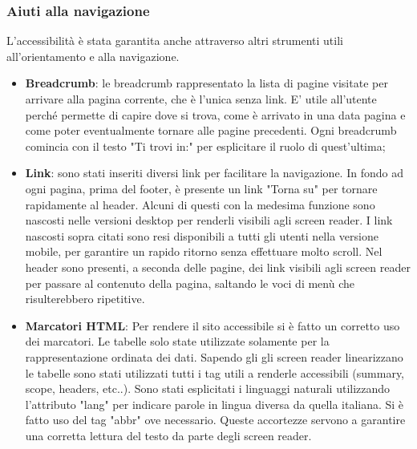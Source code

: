 \subsubsection{Aiuti alla navigazione}
 L'accessibilità è stata garantita anche attraverso altri strumenti utili all'orientamento e alla navigazione.
 \begin{itemize}
     \item \textbf{Breadcrumb}: le breadcrumb rappresentato la lista di pagine visitate per arrivare alla pagina corrente, che è l'unica senza link. E' utile all'utente perché permette di capire dove si trova, come è arrivato in una data pagina e come poter eventualmente tornare alle pagine precedenti. Ogni breadcrumb comincia con il testo "Ti trovi in:" per esplicitare il ruolo di quest'ultima;
     \item \textbf{Link}: sono stati inseriti diversi link per facilitare la navigazione. In fondo ad ogni pagina, prima del footer, è presente un link "Torna su" per tornare rapidamente al header. Alcuni di questi con la medesima funzione sono nascosti nelle versioni desktop per renderli visibili agli screen reader. 
     I link nascosti sopra citati sono resi disponibili a tutti gli utenti nella versione mobile, per garantire un rapido ritorno senza effettuare molto scroll.
     Nel header sono presenti, a seconda delle pagine, dei link visibili agli screen reader per passare al contenuto della pagina, saltando le voci di menù che risulterebbero ripetitive.
     \item \textbf{Marcatori HTML}: Per rendere il sito accessibile si è fatto un corretto uso dei marcatori.
     Le tabelle solo state utilizzate solamente per la rappresentazione ordinata dei dati. Sapendo gli gli screen reader linearizzano le tabelle sono stati utilizzati tutti i tag utili a renderle accessibili (summary, scope, headers, etc..). Sono stati esplicitati i linguaggi naturali utilizzando l'attributo "lang" per indicare parole in lingua diversa da quella italiana. Si è fatto uso del tag "abbr" ove necessario. Queste accortezze servono a garantire una corretta lettura del testo da parte degli screen reader.
 \end{itemize}